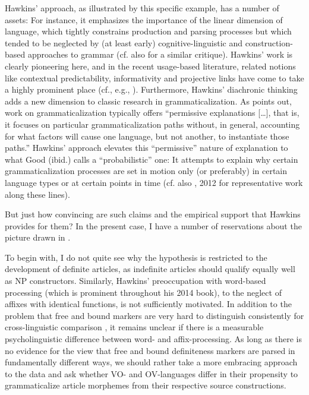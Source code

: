 \documentclass[output=paper]{langsci/langscibook}
\begin{document}
Hawkins’ approach, as illustrated by this specific example, has a number of assets: For instance, it emphasizes the importance of the linear dimension of language, which tightly constrains production and parsing processes but which tended to be neglected by (at least early) cognitive-linguistic and construction-based approaches to grammar (cf. also \citealt{Diessel2011_Review} for a similar critique). Hawkins’ work is clearly pioneering here, and in the recent usage-based literature, related notions like contextual predictability, informativity and projective links have come to take a highly prominent place (cf., e.g., \citealt{GahlGarnsey2004,Levy2008,Auer2009}). Furthermore, Hawkins’ diachronic thinking adds a new dimension to classic research in grammaticalization. As \citet[7]{Good2008_Intro} points out, work on grammaticalization typically offers “permissive explanations […], that is, it focuses on particular grammaticalization paths without, in general, accounting for what factors will cause one language, but not another, to instantiate those paths.” Hawkins’ approach elevates this “permissive” nature of explanation to what Good (ibid.) calls a “probabilistic” one: It attempts to explain why certain grammaticalization processes are set in motion only (or preferably) in certain language types or at certain points in time (cf. also \citealt{Hawkins1986}, 2012 for representative work along these lines).

But just how convincing are such claims and the empirical support that Hawkins provides for them? In the present case, I have a number of reservations about the picture drawn in \citet{Hawkins2014_VarEff}.

To begin with, I do not quite see why the hypothesis is restricted to the development of definite articles, as indefinite articles should qualify equally well as NP constructors. Similarly, Hawkins’ preoccupation with word-based processing (which is prominent throughout his 2014 book), to the neglect of affixes with identical functions, is not sufficiently motivated. In addition to the problem that free and bound markers are very hard to distinguish consistently for cross-linguistic comparison \citep{Haspelmath2011}, it remains unclear if there is a measurable psycholinguistic difference between word- and affix-processing. As long as there is no evidence for the view that free and bound definiteness markers are parsed in fundamentally different ways, we should rather take a more embracing approach to the data and ask whether VO- and OV-languages differ in their propensity to grammaticalize article morphemes from their respective source constructions.
\end{document}
